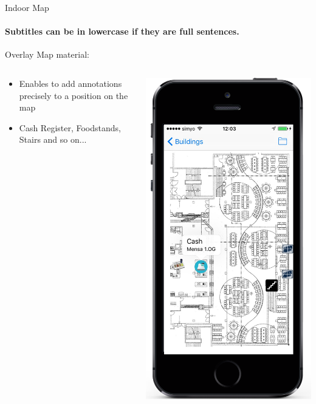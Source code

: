 \documentclass[11pt]{beamer}
\begin{document}
\begin{frame}{Indoor Map}

\framesubtitle{Subtitles can be in lowercase if they are full sentences.}
Overlay Map material:

  \begin{columns}[T]
  \begin{column}{.6\textwidth}
  \begin{itemize}
    \item Enables to add annotations precisely to a position on the map
    \item Cash Register, Foodstands, Stairs and so on...
  \end{itemize}
  \end{column}
  \begin{column}{.4\textwidth}
  \includegraphics[scale=0.25]{mapmensainfo}
  \end{column}
\end{columns}

\end{frame}
\end{document}
